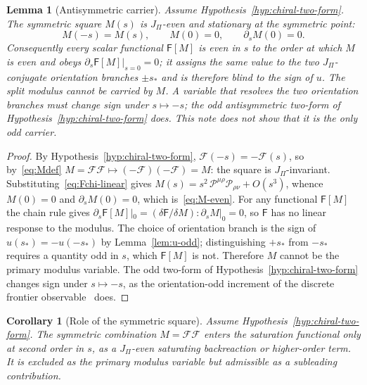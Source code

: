 \documentclass[11pt]{article}
\newtheorem{lemma}{Lemma}
\newtheorem{corollary}{Corollary}
\theoremstyle{definition}
\theoremstyle{remark}
\newcommand{\JPi}{J_{\Pi}}
\newcommand{\Fchi}{\mathcal{F}}
\newcommand{\Pchi}{\mathcal{P}}
\begin{document}
    \begin{lemma}[Antisymmetric carrier]
      \label{lem:antisymmetry}
      Assume Hypothesis~\ref{hyp:chiral-two-form}.
      The symmetric square $M(s)$ is $\JPi$-even and stationary at the symmetric point:
      \begin{equation}
        \label{eq:M-even}
        M(-s) = M(s), \qquad M(0) = 0, \qquad \partial_s M(0) = 0 .
      \end{equation}
      Consequently every scalar functional $\mathsf{F}[M]$ is even in $s$ to the order at which $M$ is even and obeys
      $\partial_s \mathsf{F}[M]|_{s=0} = 0$; it assigns the same value to the two $\JPi$-conjugate orientation branches $\pm s_*$ and is
      therefore
      blind to the sign of $u$.
      The split modulus cannot be carried by $M$.
      A variable that resolves the two orientation branches must change sign under $s \mapsto -s$; the odd antisymmetric two-form
      of Hypothesis~\ref{hyp:chiral-two-form} does.
      This note does not show that it is the only odd carrier.
    \end{lemma}

    \begin{proof}
      By Hypothesis~\ref{hyp:chiral-two-form}, $\Fchi(-s) = -\Fchi(s)$, so by~\eqref{eq:Mdef}
      $M = \Fchi \Fchi \mapsto (-\Fchi)(-\Fchi) = M$: the square is $\JPi$-invariant.
      Substituting~\eqref{eq:Fchi-linear} gives $M(s) = s^2\, \Pchi^{\mu\rho} \Pchi_{\rho\nu} + O(s^3)$, whence
      $M(0) = 0$ and $\partial_s M(0) = 0$, which is~\eqref{eq:M-even}.
      For any functional $\mathsf{F}[M]$ the chain rule gives
      $\partial_s \mathsf{F}[M]|_{0} = (\delta\mathsf{F}/\delta M) : \partial_s M|_{0} = 0$, so $\mathsf{F}$ has no linear response to the
      modulus.
      The choice of orientation branch is the sign of $u(s_*) = -u(-s_*)$ by Lemma~\ref{lem:u-odd}; distinguishing $+s_*$ from
      $-s_*$ requires a quantity odd in $s$, which $\mathsf{F}[M]$ is not.
      Therefore $M$ cannot be the primary modulus variable.
      The odd two-form of Hypothesis~\ref{hyp:chiral-two-form} changes sign under $s \mapsto -s$, as the
      orientation-odd increment of the discrete frontier observable~\cite{Beau2026q11of, Beau2026aar} does.
    \end{proof}

    \begin{corollary}[Role of the symmetric square]
      \label{cor:M-backreaction}
      Assume Hypothesis~\ref{hyp:chiral-two-form}.
      The symmetric combination $M = \Fchi \Fchi$ enters the saturation functional only at second order in $s$, as a
      $\JPi$-even saturating backreaction or higher-order term.
      It is excluded as the primary modulus variable but admissible as a subleading contribution.
    \end{corollary}
\end{document}
